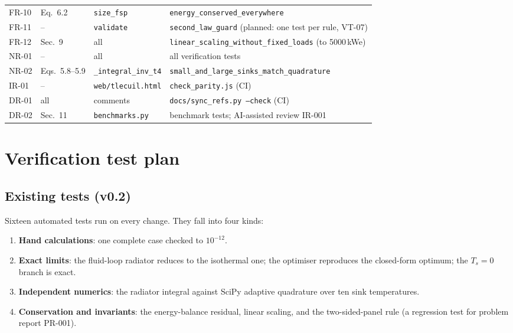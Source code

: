 \documentclass[11pt]{article}
\begin{document}
{\begin{longtable}{>{\ttfamily}p{}p{}p{}p{}}
FR-10 & Eq.~6.2 & \texttt{size\_\allowbreak{}fsp} & \texttt{energy\_\allowbreak{}conserved\_\allowbreak{}everywhere} \\
FR-11 & -- & \texttt{validate} & \texttt{second\_\allowbreak{}law\_\allowbreak{}guard} (planned: one test per rule, VT-07) \\
FR-12 & Sec.~9 & all & \texttt{linear\_\allowbreak{}scaling\_\allowbreak{}without\_\allowbreak{}fixed\_\allowbreak{}loads} (to 5000\,kWe) \\
NR-01 & -- & all & all verification tests \\
NR-02 & Eqs.~5.8--5.9 & \texttt{\_\allowbreak{}integral\_\allowbreak{}inv\_\allowbreak{}t4} & \texttt{small\_\allowbreak{}and\_\allowbreak{}large\_\allowbreak{}sinks\_\allowbreak{}match\_\allowbreak{}quadrature} \\
IR-01 & -- & \texttt{web/tlecuil.html} & \texttt{check\_\allowbreak{}parity.js} (CI) \\
DR-01 & all & comments & \texttt{docs/sync\_\allowbreak{}refs.py --check} (CI) \\
DR-02 & Sec.~11 & \texttt{benchmarks.py} & benchmark tests; AI-assisted review IR-001 \\
\bottomrule
\end{longtable}}

\section{Verification test plan}\label{sec:vtest}
\subsection{Existing tests (v0.2)}
Sixteen automated tests run on every change. They fall into four kinds:
\begin{enumerate}
  \item \textbf{Hand calculations}: one complete case checked to $10^{-12}$.
  \item \textbf{Exact limits}: the fluid-loop radiator reduces to the isothermal one; the
        optimiser reproduces the closed-form optimum; the $T_s=0$ branch is exact.
  \item \textbf{Independent numerics}: the radiator integral against SciPy adaptive
        quadrature over ten sink temperatures.
  \item \textbf{Conservation and invariants}: the energy-balance residual, linear scaling,
        and the two-sided-panel rule (a regression test for problem report PR-001).
\end{enumerate}
\end{document}
